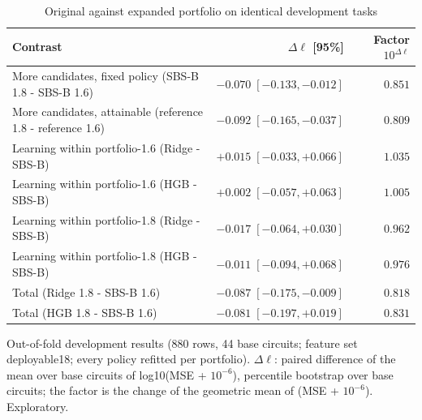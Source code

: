 \begin{table}[p]
\centering
\small
\setlength{\tabcolsep}{3.8pt}
\caption{Original against expanded portfolio on identical development tasks}
\label{tab:qem180-portfolio}
\begin{tabular}{lrr}
\toprule
Contrast & $\Delta\ell$ [95\%] & Factor $10^{\Delta\ell}$ \\
\midrule
More candidates, fixed policy (SBS-B 1.8 - SBS-B 1.6) & $-0.070\;[-0.133,-0.012]$ & $0.851$ \\
More candidates, attainable (reference 1.8 - reference 1.6) & $-0.092\;[-0.165,-0.037]$ & $0.809$ \\
Learning within portfolio-1.6 (Ridge - SBS-B) & $+0.015\;[-0.033,+0.066]$ & $1.035$ \\
Learning within portfolio-1.6 (HGB - SBS-B) & $+0.002\;[-0.057,+0.063]$ & $1.005$ \\
Learning within portfolio-1.8 (Ridge - SBS-B) & $-0.017\;[-0.064,+0.030]$ & $0.962$ \\
Learning within portfolio-1.8 (HGB - SBS-B) & $-0.011\;[-0.094,+0.068]$ & $0.976$ \\
Total (Ridge 1.8 - SBS-B 1.6) & $-0.087\;[-0.175,-0.009]$ & $0.818$ \\
Total (HGB 1.8 - SBS-B 1.6) & $-0.081\;[-0.197,+0.019]$ & $0.831$ \\
\bottomrule
\end{tabular}
\par\vspace{0.5em}
\begin{minipage}{0.97\linewidth}
\footnotesize Out-of-fold development results (880 rows, 44 base circuits; feature set deployable18; every policy refitted per portfolio). $\Delta\ell$: paired difference of the mean over base circuits of log10(MSE + $10^{-6}$), percentile bootstrap over base circuits; the factor is the change of the geometric mean of (MSE + $10^{-6}$). Exploratory.
\end{minipage}
\end{table}
